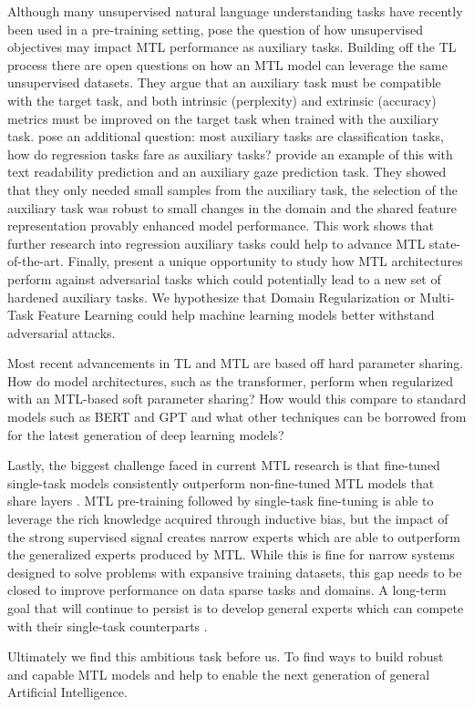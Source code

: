 \documentclass[twocolumn]{article}
\begin{document}
Although many unsupervised natural language understanding tasks have recently been used in a pre-training setting, \cite{mts2sl15} pose the question of how unsupervised objectives may impact MTL performance as auxiliary tasks. Building off the TL process there are open questions on how an MTL model can leverage the same unsupervised datasets. They argue that an auxiliary task must be compatible with the target task, and both intrinsic (perplexity) and extrinsic (accuracy) metrics must be improved on the target task when trained with the auxiliary task. \cite{whenmtl17} pose an additional question: most auxiliary tasks are classification tasks, how do regression tasks fare as auxiliary tasks? \cite{readability18} provide an example of this with text readability prediction and an auxiliary gaze prediction task. They showed that they only needed small samples from the auxiliary task, the selection of the auxiliary task was robust to small changes in the domain and the shared feature representation provably enhanced model performance. This work shows that further research into regression auxiliary tasks could help to advance MTL state-of-the-art. Finally, \cite{mtdnn19} present a unique opportunity to study how MTL architectures perform against adversarial tasks which could potentially lead to a new set of hardened auxiliary tasks. We hypothesize that Domain Regularization or Multi-Task Feature Learning could help machine learning models better withstand adversarial attacks.

Most recent advancements in TL and MTL are based off hard parameter sharing. How do model architectures, such as the transformer, perform when regularized with an MTL-based soft parameter sharing? How would this compare to standard models such as BERT and GPT and what other techniques can be borrowed from \cite{mtloverview17} for the latest generation of deep learning models?

Lastly, the biggest challenge faced in current MTL research is that fine-tuned single-task models consistently outperform non-fine-tuned MTL models that share layers \citep{decanlp18,bam19}. MTL pre-training followed by single-task fine-tuning is able to leverage the rich knowledge acquired through inductive bias, but the impact of the strong supervised signal creates narrow experts which are able to outperform the generalized experts produced by MTL. While this is fine for narrow systems designed to solve problems with expansive training datasets, this gap needs to be closed to improve performance on data sparse tasks and domains. A long-term goal that will continue to persist is to develop general experts which can compete with their single-task counterparts \citep{generalai19}.

Ultimately we find this ambitious task before us. To find ways to build robust and capable MTL models and help to enable the next generation of general Artificial Intelligence.


\end{document}
